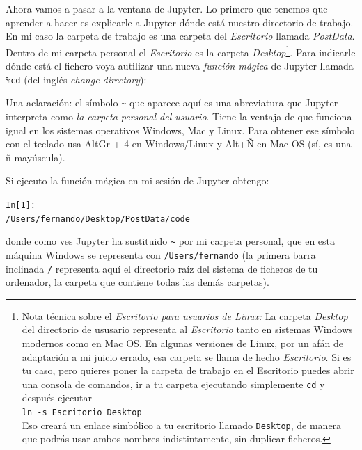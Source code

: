 \documentclass[10pt,a4paper]{article}\usepackage[]{graphicx}\usepackage[]{color}
\makeatletter
\newenvironment{kframe}{%
 \def\at@end@of@kframe{}%
 \ifinner\ifhmode%
  \def\at@end@of@kframe{\end{minipage}}%
  \begin{minipage}{\columnwidth}%
 \fi\fi%
 \def\FrameCommand##1{\hskip\@totalleftmargin \hskip-\fboxsep
 \colorbox{shadecolor}{##1}\hskip-\fboxsep
     \hskip-\linewidth \hskip-\@totalleftmargin \hskip\columnwidth}%
 \MakeFramed {\advance\hsize-\width
   \@totalleftmargin\z@ \linewidth\hsize
   \@setminipage}}%
 {\par\unskip\endMakeFramed%
 \at@end@of@kframe}
\newenvironment{knitrout}{}{} %
\newcounter {cont01}
\makeatother
\begin{document}
Ahora vamos a pasar a la ventana de Jupyter. Lo primero que tenemos que aprender a hacer es explicarle a Jupyter dónde está nuestro directorio de trabajo. En mi caso la carpeta de trabajo es una carpeta del {\em Escritorio} llamada {\em PostData}. Dentro de mi carpeta personal el {\em Escritorio} es la carpeta {\em Desktop}\footnote{Nota técnica sobre el {\em Escritorio para usuarios de Linux:} La carpeta {\em Desktop} del directorio de ususario representa al {\em Escritorio} tanto en sistemas Windows modernos como en Mac OS. En algunas versiones de Linux, por un afán de adaptación a mi juicio errado, esa carpeta se llama de hecho {\em Escritorio}. Si es tu caso, pero quieres poner la carpeta de trabajo en el Escritorio puedes abrir una consola de comandos, ir a tu carpeta ejecutando simplemente {\tt cd} y después ejecutar\\ {\tt ln -s Escritorio Desktop}\\ Eso creará un {\sf enlace simbólico} a tu escritorio llamado {\tt Desktop}, de manera que podrás usar ambos nombres indistintamente, sin duplicar ficheros.}. Para indicarle dónde está el fichero voya autilizar una nueva {\em función mágica} de Jupyter llamada \verb#%cd#
(del inglés {\em change directory}):
\begin{knitrout}
\color{fgcolor}\begin{kframe}
\begin{alltt}
\end{alltt}
\end{kframe}
\end{knitrout}
Una aclaración: el símbolo \verb#~# que aparece aquí es una abreviatura que Jupyter interpreta como {\em la carpeta personal del usuario}. Tiene la ventaja de que funciona igual en los sistemas operativos Windows, Mac y Linux. Para obtener ese símbolo con el teclado usa AltGr + 4 en Windows/Linux y Alt+Ñ en Mac OS (sí, es una ñ mayúscula).

Si ejecuto la función mágica en mi sesión de Jupyter obtengo:
\begin{knitrout}
\color{fgcolor}\begin{kframe}
\begin{alltt}
In [1]: %
/Users/fernando/Desktop/PostData/code
\end{alltt}
\end{kframe}
\end{knitrout}
donde como ves Jupyter ha sustituido \verb#~# por mi carpeta personal, que en esta máquina Windows se representa con {\tt /Users/fernando} (la primera barra inclinada {\tt /} representa aquí el {\sf directorio raíz} del sistema de ficheros de tu ordenador, la carpeta que contiene todas las demás carpetas).
\end{document}
